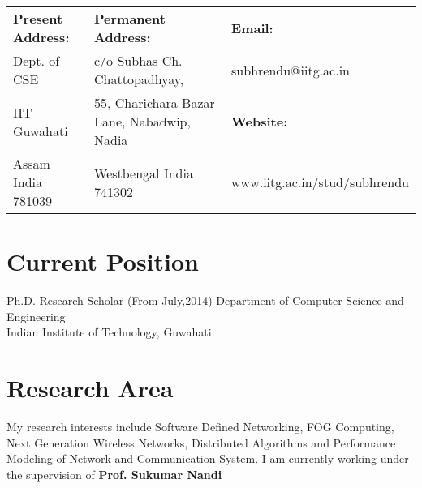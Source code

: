 \documentclass{res}
\begin{document}
 


%
%                                  
\begin{resume}
	\begin{table}[h]
	\centering
	\begin{tabular}{|lll|}
	\hline
	{\bf Present Address:}    & {\bf Permanent Address:}        					&	{\bf Email:}               \\
	Dept. of CSE       				& c/o Subhas Ch. Chattopadhyay, 					&	subhrendu@iitg.ac.in         \\
	IIT Guwahati       			& 55, Charichara Bazar Lane, Nabadwip, Nadia  &	{\bf Website:}  \\
	Assam India 781039 		& Westbengal  India 741302 							&	www.iitg.ac.in/stud/subhrendu \\ \hline
	\end{tabular}
	\end{table}
 \noindent\makebox[\linewidth]{\rule{\textwidth}{0.4pt}}
\section{Current Position}          
	Ph.D. Research Scholar  (From July,2014)  
    Department of Computer Science and Engineering\\
    Indian Institute of Technology, Guwahati
\section{Research Area}    
 		My research interests include Software Defined Networking, FOG Computing, Next Generation Wireless Networks, Distributed Algorithms and Performance Modeling of Network and Communication System. I am currently working under the supervision of {\bf Prof. Sukumar Nandi}

\end{resume}
\end{document}

